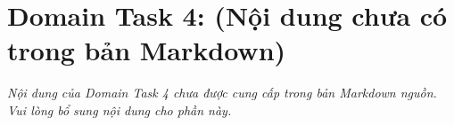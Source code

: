 \section{Domain Task 4: (Nội dung chưa có trong bản Markdown)}


\textit{Nội dung của Domain Task 4 chưa được cung cấp trong bản Markdown nguồn.
Vui lòng bổ sung nội dung cho phần này.}

